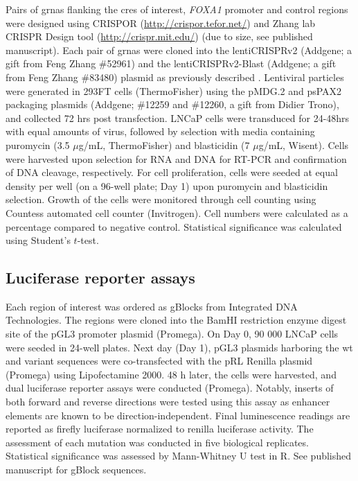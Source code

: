 Pairs of \glspl{grna} flanking the \glspl{cre} of interest, \emph{FOXA1} promoter and control regions were designed using CRISPOR (\url{http://crispor.tefor.net/}) and Zhang lab CRISPR Design tool (\url{http://crispr.mit.edu/}) (due to size, see published manuscript).
Each pair of \glspl{grna} were cloned into the lentiCRISPRv2 (Addgene; a gift from Feng Zhang \#52961) and the lentiCRISPRv2-Blast (Addgene; a gift from Feng Zhang \#83480) plasmid as previously described \cite{sanjanaImprovedVectorsGenomewide2014}.
Lentiviral particles were generated in 293FT cells (ThermoFisher) using the pMDG.2 and psPAX2 packaging plasmids (Addgene; \#12259 and \#12260, a gift from Didier Trono), and collected 72 hrs post transfection.
LNCaP cells were transduced for 24-48hrs with equal amounts of virus, followed by selection with media containing puromycin (3.5 $\mu$g/mL, ThermoFisher) and blasticidin (7 $\mu$g/mL, Wisent).
Cells were harvested upon selection for RNA and DNA for RT-PCR and confirmation of DNA cleavage, respectively.
For cell proliferation, cells were seeded at equal density per well (on a 96-well plate; Day 1) upon puromycin and blasticidin selection.
Growth of the cells were monitored through cell counting using Countess automated cell counter (Invitrogen).
Cell numbers were calculated as a percentage compared to negative control.
Statistical significance was calculated using Student's $t$-test.

\subsection{Luciferase reporter assays}

Each region of interest was ordered as gBlocks from Integrated DNA Technologies.
The regions were cloned into the BamHI restriction enzyme digest site of the pGL3 promoter plasmid (Promega).
On Day 0, 90 000 LNCaP cells were seeded in 24-well plates.
Next day (Day 1), pGL3 plasmids harboring the \gls{wt} and variant sequences were co-transfected with the pRL Renilla plasmid (Promega) using Lipofectamine 2000.
48 h later, the cells were harvested, and dual luciferase reporter assays were conducted (Promega).
Notably, inserts of both forward and reverse directions were tested using this assay as enhancer elements are known to be direction-independent.
Final luminescence readings are reported as firefly luciferase normalized to renilla luciferase activity.
The assessment of each mutation was conducted in five biological replicates.
Statistical significance was assessed by Mann-Whitney U test in R.
See published manuscript for gBlock sequences.

